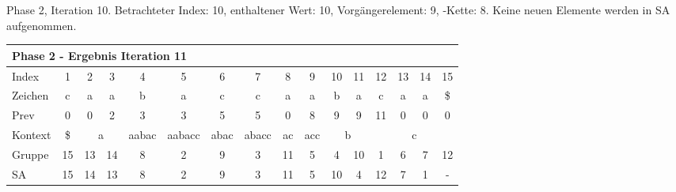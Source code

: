 \begin{table}[H]
\caption[Phase 2, Iteration 10]{Phase 2, Iteration 10. Betrachteter Index: 10, enthaltener Wert: 10, Vorgängerelement: 9, \prevpointer-Kette: 8. Keine neuen Elemente werden in SA aufgenommen.} 
\label{table_complex_example_2_10} 
\end{table}

\begin{table}[H]
\centering
\begin{adjustbox}{max width=\textwidth}
\centering
\begin{tabular}{lccccccccccccccc}
\multicolumn{16}{l}{Phase 2 - Ergebnis Iteration 11}                                                                                                                                                                                                                                                                                         \\ \hline
\multicolumn{1}{l|}{Index}   & 1                       & 2  & 3                       & 4                          & 5                           & 6                         & 7                          & 8                       & 9                        & 10 & 11                                             & 12  & 13  & 14  & 15  \\
\multicolumn{1}{l|}{Zeichen} & c                       & a  & a                       & b                          & a                           & c                         & c                          & a                       & a                        & b  & a                                              & c   & a   & a   & \$  \\
\multicolumn{1}{l|}{Prev}    & 0                       & 0  & 2                       & 3                          & 3                           & 5                         & 5                          & 0                       & 8                        & 9  & 9                                              & 11  & 0   & 0   & 0   \\ \hline
\multicolumn{1}{l|}{Kontext} & \multicolumn{1}{c|}{\$} & \multicolumn{2}{c|}{a}       & \multicolumn{1}{c|}{aabac} & \multicolumn{1}{c|}{aabacc} & \multicolumn{1}{c|}{abac} & \multicolumn{1}{c|}{abacc} & \multicolumn{1}{c|}{ac} & \multicolumn{1}{c|}{acc} & \multicolumn{2}{c|}{b}                              & \multicolumn{4}{c}{c} \\
\multicolumn{1}{l|}{Gruppe}  & \multicolumn{1}{c|}{15} & 13 & \multicolumn{1}{c|}{14} & \multicolumn{1}{c|}{8}     & \multicolumn{1}{c|}{2}      & \multicolumn{1}{c|}{9}    & \multicolumn{1}{c|}{3}     & \multicolumn{1}{c|}{11} & \multicolumn{1}{c|}{5}   & 4  & \multicolumn{1}{c|}{10}                        & 1   & 6   & 7   & 12  \\
\multicolumn{1}{l|}{SA}      & \multicolumn{1}{c|}{15} & 14 & \multicolumn{1}{c|}{13} & \multicolumn{1}{c|}{8}     & \multicolumn{1}{c|}{2}      & \multicolumn{1}{c|}{9}    & \multicolumn{1}{c|}{3}     & \multicolumn{1}{c|}{11} & \multicolumn{1}{c|}{5}   & 10 & \multicolumn{1}{c|}{\cellcolor[HTML]{\green}4} & 12  & 7   & 1   & -  
\end{tabular}
\end{adjustbox}


\end{table}
